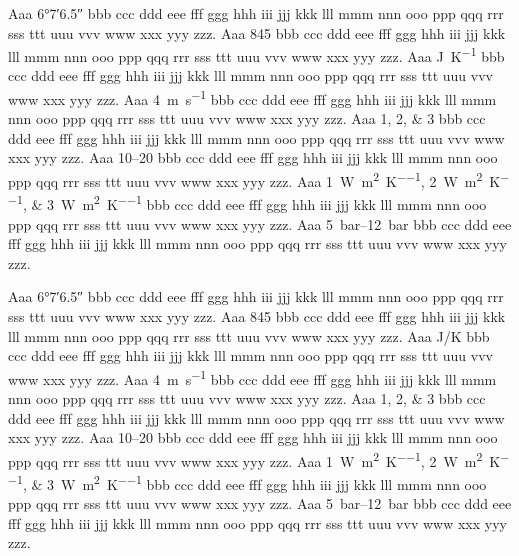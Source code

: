 \documentclass{article}
\begin{document}
Aaa \ang{6;7;6.5} bbb ccc ddd eee fff ggg hhh iii jjj kkk lll mmm nnn ooo ppp
qqq rrr sss ttt uuu vvv www xxx yyy zzz. Aaa \num{845} bbb ccc ddd eee fff ggg
hhh iii jjj kkk lll mmm nnn ooo ppp qqq rrr sss ttt uuu vvv www xxx yyy zzz.
Aaa \si{\joule\per\kelvin} bbb ccc ddd eee fff ggg hhh iii jjj kkk lll mmm nnn
ooo ppp qqq rrr sss ttt uuu vvv www xxx yyy zzz. Aaa \SI{4}{\meter\per\second}
bbb ccc ddd eee fff ggg hhh iii jjj kkk lll mmm nnn ooo ppp qqq rrr sss ttt uuu
vvv www xxx yyy zzz. Aaa \numlist{1;2;3} bbb ccc ddd eee fff ggg hhh iii jjj
kkk lll mmm nnn ooo ppp qqq rrr sss ttt uuu vvv www xxx yyy zzz. Aaa
\numrange{10}{20} bbb ccc ddd eee fff ggg hhh iii jjj kkk lll mmm nnn ooo ppp
qqq rrr sss ttt uuu vvv www xxx yyy zzz. Aaa
\SIlist{1;2;3}{\watt\per\square\meter\per\kelvin} bbb ccc ddd eee fff ggg hhh
iii jjj kkk lll mmm nnn ooo ppp qqq rrr sss ttt uuu vvv www xxx yyy zzz. Aaa
\SIrange{5}{12}{\bar} bbb ccc ddd eee fff ggg hhh iii jjj kkk lll mmm nnn ooo
ppp qqq rrr sss ttt uuu vvv www xxx yyy zzz.

Aaa \ang[arc-separator = \,]{6;7;6.5} bbb ccc ddd eee fff ggg hhh iii jjj kkk
lll mmm nnn ooo ppp qqq rrr sss ttt uuu vvv www xxx yyy zzz. Aaa
\num[round-mode=figures]{845} bbb ccc ddd eee fff ggg hhh iii jjj kkk lll mmm
nnn ooo ppp qqq rrr sss ttt uuu vvv www xxx yyy zzz. Aaa
\si[per-mode=symbol]{\joule\per\kelvin} bbb ccc ddd eee fff ggg hhh iii jjj kkk
lll mmm nnn ooo ppp qqq rrr sss ttt uuu vvv www xxx yyy zzz. Aaa
\SI{4}{\meter\per\second} bbb ccc ddd eee fff ggg hhh iii jjj kkk
lll mmm nnn ooo ppp qqq rrr sss ttt uuu vvv www xxx yyy zzz. Aaa
\numlist[list-separator = {; }]{1;2;3} bbb ccc ddd eee fff ggg hhh iii jjj kkk
lll mmm nnn ooo ppp qqq rrr sss ttt uuu vvv www xxx yyy zzz. Aaa
\numrange[range-phrase = --]{10}{20} bbb ccc ddd eee fff ggg hhh iii jjj kkk
lll mmm nnn ooo ppp qqq rrr sss ttt uuu vvv www xxx yyy zzz. Aaa
\SIlist[list-units = brackets]{1;2;3}{\watt\per\square\meter\per\kelvin} bbb
ccc ddd eee fff ggg hhh iii jjj kkk lll mmm nnn ooo ppp qqq rrr sss ttt uuu vvv
www xxx yyy zzz. Aaa \SIrange[range-units = brackets]{5}{12}{\bar} bbb ccc ddd
eee fff ggg hhh iii jjj kkk lll mmm nnn ooo ppp qqq rrr sss ttt uuu vvv www xxx
yyy zzz.
\end{document}
